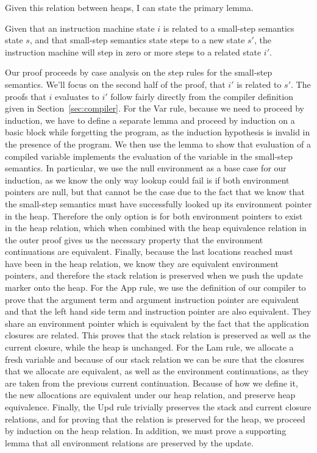 Given this relation between heaps, I can state the primary lemma.
\begin{lemma} \label{lem:cesm_im}
Given that an instruction machine state $i$ is related to a small-step
semantics state $s$, and that small-step semantics state steps to a new state
$s'$, the instruction machine will step in zero or more steps to a related state
$i'$.
\end{lemma}
\begin{proofoutline}
Our proof proceeds by case analysis on the step rules for the small-step
semantics. We'll focus on the second half of the proof, that $i'$ is related to
$s'$. The proofs that $i$ evaluates to $i'$ follow fairly directly from the
compiler definition given in Section~\ref{sec:compiler}. For the Var rule,
because we need to proceed by induction, we have to define a separate lemma and
proceed by induction on a basic block while forgetting the program, as the
induction hypothesis is invalid in the presence of the program. We then use the
lemma to show that evaluation of a compiled variable implements the evaluation
of the variable in the small-step semantics. In particular, we use the null
environment as a base case for our induction, as we know the only way lookup
could fail is if both environment pointers are null, but that cannot be the
case due to the fact that we know that the small-step semantics must have
successfully looked up its environment pointer in the heap. Therefore the only
option is for both environment pointers to exist in the heap relation, which
when combined with the heap equivalence relation in the outer proof gives us the
necessary property that the environment continuations are equivalent. Finally,
because the last locations reached must have been in the heap relation, we know
they are equivalent environment pointers, and therefore the stack relation is
preserved when we push the update marker onto the heap. For the App rule, we use
the definition of our compiler to prove that the argument term and argument
instruction pointer are equivalent and that the left hand side term and
instruction pointer are also equivalent. They share an environment pointer which
is equivalent by the fact that the application closures are related.  This
proves that the stack relation is preserved as well as the current closure,
while the heap is unchanged. For the Lam rule, we allocate a fresh variable and
because of our stack relation we can be sure that the closures that we
allocate are equivalent, as well as the environment continuations, as they are
taken from the previous current continuation. Because of how we define it, the
new allocations are equivalent under our heap relation, and preserve heap
equivalence. Finally, the Upd rule trivially preserves the stack and current
closure relations, and for proving that the relation is preserved for the
heap, we proceed by induction on the heap relation. In addition, we must prove
a supporting lemma that all environment relations are preserved by the update.
\end{proofoutline}

